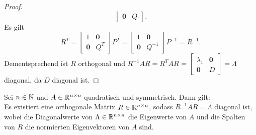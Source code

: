 \begin{proof}
\begin{equation*}
\begin{bmatrix}
            \symbf{0} & Q
        \end{bmatrix}. 
    \end{equation*}   
    Es gilt
    \begin{equation*}
        R^{T} =
        \begin{bmatrix}
            1 & \symbf{0} \\
            \symbf{0} & Q^{T}
        \end{bmatrix}
        P^{T}
        =
        \begin{bmatrix}
            1 & \symbf{0} \\
            \symbf{0} & Q^{-1}
        \end{bmatrix}
        P^{-1} 
        =
        R^{-1}.
    \end{equation*}
    Dementsprechend ist \(R\) orthogonal und \(R^{-1}AR = R^{T}AR\) = 
    \(
    \begin{bmatrix}
        {\lambda}_1 & \symbf{0} \\
        \symbf{0} & D
    \end{bmatrix}
    =
    \Lambda
    \)  
    diagonal, da \(D\) diagonal ist.              
\end{proof}
\begin{corollary}\label{cor:spec}
    Sei \(n \in \mathbb{N}\) und \(A \in \mathbb{R}^{n \times n}\) quadratisch und symmetrisch. Dann gilt: \\
    Es existiert eine orthogonale Matrix \(R \in \mathbb{R}^{n \times n}\), sodass \(R^{-1}AR = \Lambda\) diagonal ist, wobei die Diagonalwerte von \(\Lambda \in \mathbb{R}^{n \times n}\) die Eigenwerte von \(A\) und die Spalten von \(R\) die normierten Eigenvektoren von \(A\) sind.  
\end{corollary}
